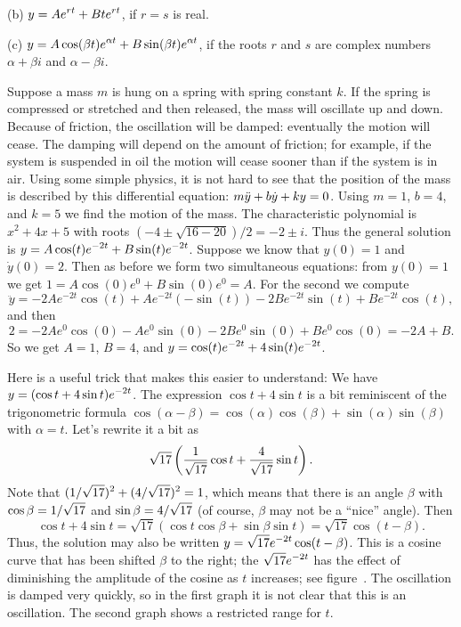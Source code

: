 \item{(b)} $\displaystyle y=Ae^{rt}+Bte^{rt}$, if $r=s$ is real.

\item{(c)} $\displaystyle y=A\cos(\beta t)e^{\alpha t}+B\sin(\beta t)e^{\alpha t}$, 
if the roots $r$ and $s$ are complex numbers $\alpha+\beta i$ and
$\alpha-\beta i$.

\endlist
\endthmnoproof

\example Suppose 
a mass $m$ is hung on a spring with spring
constant $k$. If the spring is compressed or stretched and then
released, the mass will oscillate up and down. Because of friction,
the oscillation will be damped: eventually the motion will cease. The
damping will depend on the amount of friction; for example, if the
system is suspended in oil the motion will cease sooner than if the
system is in air. Using some simple physics, it is not hard to see
that the position of the mass is described by this differential
equation:
$\displaystyle m\ddot y+b\dot y+ky=0$. Using $m=1$, $b=4$, and $k=5$ we find the
motion of the mass. The characteristic polynomial is 
$x^2+4x+5$ with roots $(-4\pm\sqrt{16-20})/2=-2\pm i$. Thus the
general solution is
$\displaystyle y=A\cos(t)e^{-2t}+B\sin(t)e^{-2t}$.
Suppose we know that $y(0)=1$ and $\dot y(0)=2$. Then as before we
form two simultaneous equations: from $y(0)=1$ we get
$1=A\cos(0)e^0+B\sin(0)e^0=A$. For the second we compute
$$\ddot y=-2Ae^{-2t}\cos(t)+Ae^{-2t}(-\sin(t))-2Be^{-2t}\sin(t)+
Be^{-2t}\cos(t),$$
and then
$$2=-2Ae^0\cos(0)-Ae^0\sin(0)-2Be^0\sin(0)+Be^0\cos(0)
=-2A+B.$$
So we get $A=1$, $B=4$, and $\displaystyle y=\cos(t)e^{-2t}+4\sin(t)e^{-2t}$.

Here is a useful trick that makes this easier to understand: We have
$\displaystyle y=(\cos t+4\sin t)e^{-2t}$. The expression $\cos t+4 \sin t$ is a
bit reminiscent of the trigonometric formula
$\cos(\alpha-\beta)=\cos(\alpha)\cos(\beta)+\sin(\alpha)\sin(\beta)$
with $\alpha=t$.
Let's rewrite it a bit as
$$\sqrt{17}\left({1\over\sqrt{17}}\cos t + {4\over\sqrt{17}}\sin t\right).$$
Note that $\displaystyle (1/\sqrt{17})^2+(4/\sqrt{17})^2=1$, 
which means that there is an angle
$\beta$ with $\displaystyle \cos\beta=1/\sqrt{17}$ and 
$\displaystyle \sin\beta=4/\sqrt{17}$ (of course, $\beta$ may not be a ``nice'' angle). Then
$$\cos t+4\sin t = \sqrt{17}\left(\cos t\cos \beta+\sin\beta\sin t\right)
=\sqrt{17}\cos(t-\beta).$$
Thus, the solution may also be written
$\displaystyle y=\sqrt{17}e^{-2t}\cos(t-\beta)$.
This is a cosine curve  that has been shifted $\beta$ to the
right; the $\displaystyle \sqrt{17}e^{-2t}$ has the effect of diminishing the
amplitude of the cosine as $t$ increases; see
figure~. The oscillation is damped very
quickly, so in the first graph it is not clear that this is an
oscillation. The second graph shows a restricted range for $t$.
\endexample

